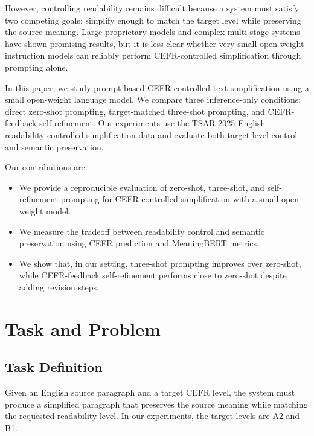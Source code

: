 \documentclass[11pt]{article}
\begin{document}
However, controlling readability remains difficult because a system must satisfy two competing goals: simplify enough to match the target level while preserving the source meaning. Large proprietary models and complex multi-stage systems have shown promising results, but it is less clear whether very small open-weight instruction models can reliably perform CEFR-controlled simplification through prompting alone.

In this paper, we study prompt-based CEFR-controlled text simplification using a small open-weight language model. We compare three inference-only conditions: direct zero-shot prompting, target-matched three-shot prompting, and CEFR-feedback self-refinement. Our experiments use the TSAR 2025 English readability-controlled simplification data and evaluate both target-level control and semantic preservation.

Our contributions are:
\begin{itemize}
    \item We provide a reproducible evaluation of zero-shot, three-shot, and self-refinement prompting for CEFR-controlled simplification with a small open-weight model.
    \item We measure the tradeoff between readability control and semantic preservation using CEFR prediction and MeaningBERT metrics.
    \item We show that, in our setting, three-shot prompting improves over zero-shot, while CEFR-feedback self-refinement performs close to zero-shot despite adding revision steps.
\end{itemize}

\section{Task and Problem}

\subsection{Task Definition}

Given an English source paragraph and a target CEFR level, the system must produce a simplified paragraph that preserves the source meaning while matching the requested readability level. In our experiments, the target levels are A2 and B1.
\end{document}
